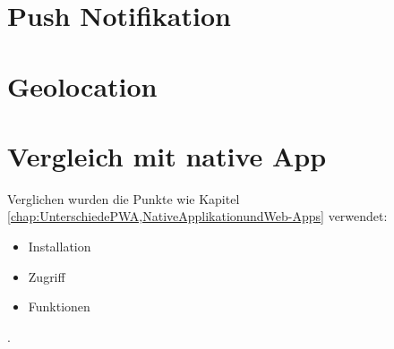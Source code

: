\section{Push Notifikation}



\section{Geolocation}


\section{Vergleich mit native App}
Verglichen wurden die Punkte wie Kapitel \ref{chap:UnterschiedePWA,NativeApplikationundWeb-Apps} verwendet:
\begin{itemize}
   \item   Installation
	\item  Zugriff
	\item  Funktionen
\end{itemize}. 





